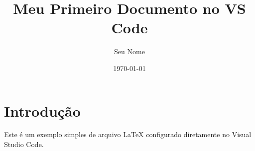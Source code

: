 \documentclass{article}
\title{Meu Primeiro Documento no VS Code}
\author{Seu Nome}
\date{\today}
\begin{document}
\maketitle

\section{Introdução}
Este é um exemplo simples de arquivo \LaTeX{} configurado diretamente no Visual Studio Code.
\end{document}
